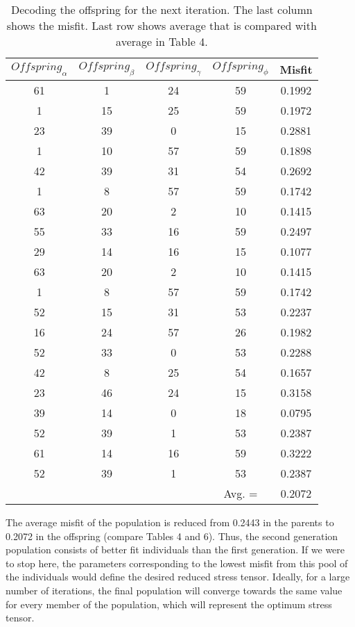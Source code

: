 \begin{table}[htb]
  \footnotesize
  \centering
  \renewcommand{\arraystretch}{1.2}
  \begin{tabular}{@{}c c c c c@{}}
    \toprule
    $ Offspring_{\alpha}$ & $ Offspring_{\beta}$ & $ Offspring_{\gamma}$ & $ Offspring_{\phi}$ & Misfit \\
   \midrule    
   
    61 & 1 & 24 & 59 & 0.1992 \\
    1 & 15 & 25 & 59 & 0.1972 \\
    23 & 39 & 0 & 15 & 0.2881 \\
    1 & 10 & 57 & 59 & 0.1898 \\
    42 & 39 & 31 & 54 & 0.2692 \\
    1 & 8 & 57 & 59 & 0.1742 \\
    63 & 20 & 2 & 10 & 0.1415 \\
    55 & 33 & 16 & 59 & 0.2497 \\
    29 & 14 & 16 & 15 & 0.1077 \\
    63 & 20 & 2 & 10 & 0.1415 \\
    1 & 8 & 57 & 59 & 0.1742 \\
    52 & 15 & 31 & 53 & 0.2237 \\
    16 & 24 & 57 & 26 & 0.1982 \\
    52 & 33 & 0 & 53 & 0.2288 \\
    42 & 8 & 25 & 54 & 0.1657 \\
    23 & 46	& 24 & 15 & 0.3158 \\
    39 & 14	& 0 & 18 & 0.0795 \\
    52 & 39	& 1 & 53 & 0.2387 \\
    61 & 14	& 16 & 59 & 0.3222 \\
    52 & 39	& 1 & 53 & 0.2387 \\
    \cmidrule(lr){4-5}
     & & & Avg. = & 0.2072 \\
   
    \bottomrule
  \end{tabular}
  \caption{Decoding the offspring for the next iteration. The last column shows the misfit. Last row shows average that is compared with average in Table 4.}\label{table:6}
\end{table}

The average misfit of the population is reduced from 0.2443 in the parents to 0.2072 in the offspring (compare Tables 4 and 6). Thus, the second generation population consists of better fit individuals than the first generation. If we were to stop here, the parameters corresponding to the lowest misfit from this pool of the individuals would define the desired reduced stress tensor. Ideally, for a large number of iterations, the final population will converge towards the same value for every member of the population, which will represent the optimum stress tensor.
\pagebreak

